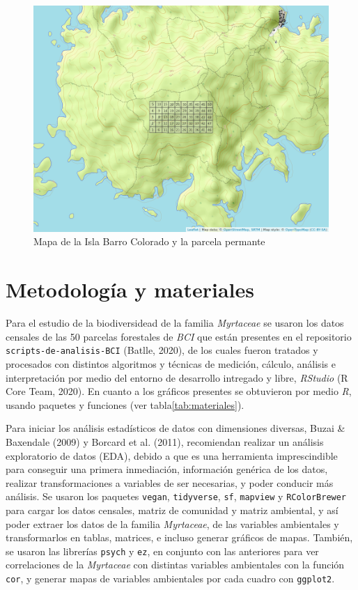 \documentclass[11pt,]{article}
\begin{document}
\begin{figure}
\centering
\includegraphics[width=1.00000\textwidth]{mapa_cuadros2.png}
\caption{Mapa de la Isla Barro Colorado y la parcela
permante\label{fig:bci_map}}
\end{figure}

\section{Metodología y materiales}\label{metodologuxeda-y-materiales}

Para el estudio de la biodiversidead de la familia \emph{Myrtaceae} se
usaron los datos censales de las 50 parcelas forestales de \emph{BCI}
que están presentes en el repositorio \texttt{scripts-de-analisis-BCI}
(Batlle, 2020), de los cuales fueron tratados y procesados con distintos
algoritmos y técnicas de medición, cálculo, análisis e interpretación
por medio del entorno de desarrollo intregado y libre, \emph{RStudio} (R
Core Team, 2020). En cuanto a los gráficos presentes se obtuvieron por
medio \emph{R}, usando paquetes y funciones (ver
tabla\ref{tab:materiales}).

Para iniciar los análisis estadísticos de datos con dimensiones
diversas, Buzai \& Baxendale (2009) y Borcard et al. (2011), recomiendan
realizar un análisis exploratorio de datos (EDA), debido a que es una
herramienta imprescindible para conseguir una primera inmediación,
información genérica de los datos, realizar transformaciones a variables
de ser necesarias, y poder conducir más análisis. Se usaron los paquetes
\texttt{vegan}, \texttt{tidyverse}, \texttt{sf}, \texttt{mapview} y
\texttt{RColorBrewer} para cargar los datos censales, matriz de
comunidad y matriz ambiental, y así poder extraer los datos de la
familia \emph{Myrtaceae}, de las variables ambientales y transformarlos
en tablas, matrices, e incluso generar gráficos de mapas. También, se
usaron las librerías \texttt{psych} y \texttt{ez}, en conjunto con las
anteriores para ver correlaciones de la \emph{Myrtaceae} con distintas
variables ambientales con la función \texttt{cor}, y generar mapas de
variables ambientales por cada cuadro con \texttt{ggplot2}.
\end{document}
